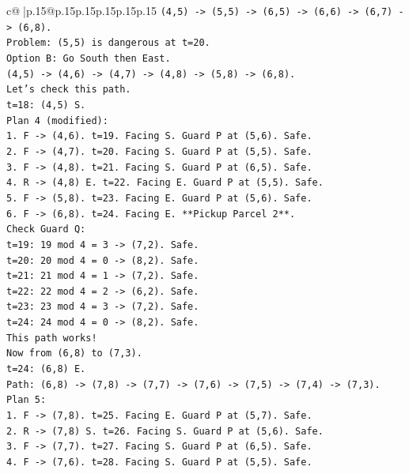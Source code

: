 \documentclass{article}
\begin{document}
{\begin{supertabular}{c@{$\;$}|p{.15\linewidth}@{}p{.15\linewidth}p{.15\linewidth}p{.15\linewidth}p{.15\linewidth}p{.15\linewidth}}
{{{\texttt{(4,5) {-}> (5,5) {-}> (6,5) {-}> (6,6) {-}> (6,7) {-}> (6,8).} \\
\texttt{Problem: (5,5) is dangerous at t=20.} \\
\texttt{Option B: Go South then East.} \\
\texttt{(4,5) {-}> (4,6) {-}> (4,7) {-}> (4,8) {-}> (5,8) {-}> (6,8).} \\
\texttt{Let's check this path.} \\
\texttt{t=18: (4,5) S.} \\
\texttt{Plan 4 (modified):} \\
\texttt{1. F {-}> (4,6). t=19. Facing S. Guard P at (5,6). Safe.} \\
\texttt{2. F {-}> (4,7). t=20. Facing S. Guard P at (5,5). Safe.} \\
\texttt{3. F {-}> (4,8). t=21. Facing S. Guard P at (6,5). Safe.} \\
\texttt{4. R {-}> (4,8) E. t=22. Facing E. Guard P at (5,5). Safe.} \\
\texttt{5. F {-}> (5,8). t=23. Facing E. Guard P at (5,6). Safe.} \\
\texttt{6. F {-}> (6,8). t=24. Facing E. **Pickup Parcel 2**.} \\
\texttt{Check Guard Q:} \\
\texttt{t=19: 19 mod 4 = 3 {-}> (7,2). Safe.} \\
\texttt{t=20: 20 mod 4 = 0 {-}> (8,2). Safe.} \\
\texttt{t=21: 21 mod 4 = 1 {-}> (7,2). Safe.} \\
\texttt{t=22: 22 mod 4 = 2 {-}> (6,2). Safe.} \\
\texttt{t=23: 23 mod 4 = 3 {-}> (7,2). Safe.} \\
\texttt{t=24: 24 mod 4 = 0 {-}> (8,2). Safe.} \\
\texttt{This path works!} \\
\texttt{Now from (6,8) to (7,3).} \\
\texttt{t=24: (6,8) E.} \\
\texttt{Path: (6,8) {-}> (7,8) {-}> (7,7) {-}> (7,6) {-}> (7,5) {-}> (7,4) {-}> (7,3).} \\
\texttt{Plan 5:} \\
\texttt{1. F {-}> (7,8). t=25. Facing E. Guard P at (5,7). Safe.} \\
\texttt{2. R {-}> (7,8) S. t=26. Facing S. Guard P at (5,6). Safe.} \\
\texttt{3. F {-}> (7,7). t=27. Facing S. Guard P at (6,5). Safe.} \\
\texttt{4. F {-}> (7,6). t=28. Facing S. Guard P at (5,5). Safe.} \\
}}}
\end{supertabular}}
\end{document}
